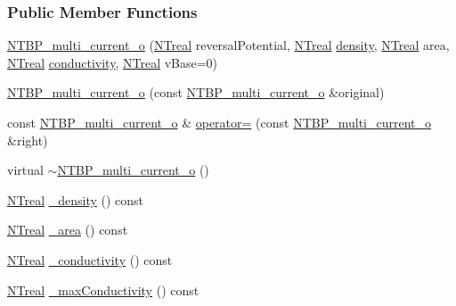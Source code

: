 \subsubsection*{Public Member Functions}
\begin{DoxyCompactItemize}
\item 
\hyperlink{class_n_t_b_p__multi__current__o_a383a48f0008631f85325a871b99f0a5b}{NTBP\_\-multi\_\-current\_\-o} (\hyperlink{nt__types_8h_a814a97893e9deb1eedcc7604529ba80d}{NTreal} reversalPotential, \hyperlink{nt__types_8h_a814a97893e9deb1eedcc7604529ba80d}{NTreal} \hyperlink{class_n_t_b_p__multi__current__o_a82138baaa276b09c13038ca1fd6f08a7}{density}, \hyperlink{nt__types_8h_a814a97893e9deb1eedcc7604529ba80d}{NTreal} area, \hyperlink{nt__types_8h_a814a97893e9deb1eedcc7604529ba80d}{NTreal} \hyperlink{class_n_t_b_p__multi__current__o_aa28a5de6d10d258e251e73bf1dcaba0d}{conductivity}, \hyperlink{nt__types_8h_a814a97893e9deb1eedcc7604529ba80d}{NTreal} vBase=0)
\item 
\hyperlink{class_n_t_b_p__multi__current__o_ac13be772ebfb91466036e9edeb753235}{NTBP\_\-multi\_\-current\_\-o} (const \hyperlink{class_n_t_b_p__multi__current__o}{NTBP\_\-multi\_\-current\_\-o} \&original)
\item 
const \hyperlink{class_n_t_b_p__multi__current__o}{NTBP\_\-multi\_\-current\_\-o} \& \hyperlink{class_n_t_b_p__multi__current__o_ac1af250b70fae40ab47247974b3f63e5}{operator=} (const \hyperlink{class_n_t_b_p__multi__current__o}{NTBP\_\-multi\_\-current\_\-o} \&right)
\item 
virtual \hyperlink{class_n_t_b_p__multi__current__o_a2f0580be92f0d0bb0b051090fddf01cd}{$\sim$NTBP\_\-multi\_\-current\_\-o} ()
\item 
\hyperlink{nt__types_8h_a814a97893e9deb1eedcc7604529ba80d}{NTreal} \hyperlink{class_n_t_b_p__multi__current__o_aeab5992b05a14ea8d22b2251c3d5f355}{\_\-density} () const 
\item 
\hyperlink{nt__types_8h_a814a97893e9deb1eedcc7604529ba80d}{NTreal} \hyperlink{class_n_t_b_p__multi__current__o_a41640dc8f6d666b65b748f9bc76c6054}{\_\-area} () const 
\item 
\hyperlink{nt__types_8h_a814a97893e9deb1eedcc7604529ba80d}{NTreal} \hyperlink{class_n_t_b_p__multi__current__o_a5d2e81c93db72da3ae4171e0faae80a1}{\_\-conductivity} () const 
\item 
\hyperlink{nt__types_8h_a814a97893e9deb1eedcc7604529ba80d}{NTreal} \hyperlink{class_n_t_b_p__multi__current__o_a5793f219bb7aaae868a99943ec86b96a}{\_\-maxConductivity} () const 
\item 

\end{DoxyCompactItemize}
